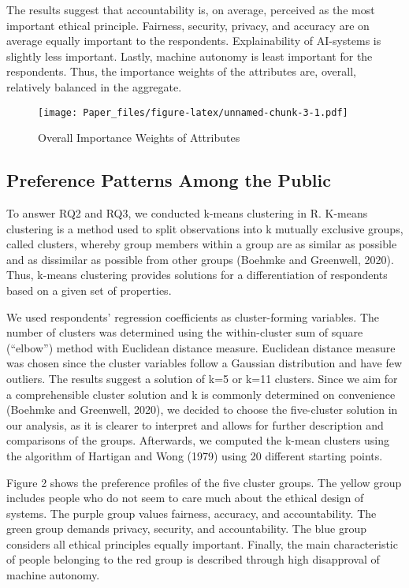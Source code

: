 \documentclass{article}
\begin{document}
The results suggest that accountability is, on average, perceived as the
most important ethical principle. Fairness, security, privacy, and
accuracy are on average equally important to the respondents.
Explainability of AI-systems is slightly less important. Lastly, machine
autonomy is least important for the respondents. Thus, the importance
weights of the attributes are, overall, relatively balanced in the
aggregate.

\begin{figure}
\centering
\texttt{[image: Paper\_files/figure-latex/unnamed-chunk-3-1.pdf]}
\caption{Overall Importance Weights of Attributes}
\end{figure}

\hypertarget{preference-patterns-among-the-public}{%
\subsection{Preference Patterns Among the
Public}\label{preference-patterns-among-the-public}}

To answer RQ2 and RQ3, we conducted k-means clustering in R. K-means
clustering is a method used to split observations into k mutually
exclusive groups, called clusters, whereby group members within a group
are as similar as possible and as dissimilar as possible from other
groups (Boehmke and Greenwell, 2020). Thus, k-means clustering provides
solutions for a differentiation of respondents based on a given set of
properties.

We used respondents' regression coefficients as cluster-forming
variables. The number of clusters was determined using the
within-cluster sum of square (``elbow'') method with Euclidean distance
measure. Euclidean distance measure was chosen since the cluster
variables follow a Gaussian distribution and have few outliers. The
results suggest a solution of k=5 or k=11 clusters. Since we aim for a
comprehensible cluster solution and k is commonly determined on
convenience (Boehmke and Greenwell, 2020), we decided to choose the
five-cluster solution in our analysis, as it is clearer to interpret and
allows for further description and comparisons of the groups.
Afterwards, we computed the k-mean clusters using the algorithm of
Hartigan and Wong (1979) using 20 different starting points.

Figure 2 shows the preference profiles of the five cluster groups. The
yellow group includes people who do not seem to care much about the
ethical design of systems. The purple group values fairness, accuracy,
and accountability. The green group demands privacy, security, and
accountability. The blue group considers all ethical principles equally
important. Finally, the main characteristic of people belonging to the
red group is described through high disapproval of machine autonomy.
\end{document}
